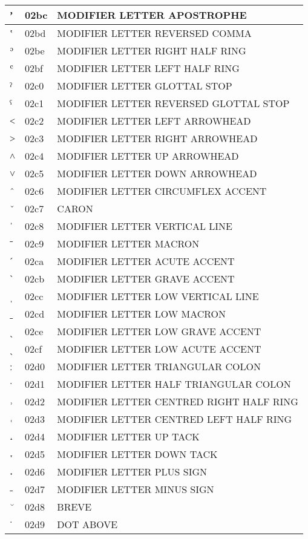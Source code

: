 \documentclass[12pt,letterpaper,openany]{book}
\begin{document}
\begin{center}
\begin{supertabular}{|m{0.25in}|m{0.5in}|m{4in}|}
ʼ & 02bc & MODIFIER LETTER APOSTROPHE\\\hline
ʽ & 02bd & MODIFIER LETTER REVERSED COMMA\\\hline
ʾ & 02be & MODIFIER LETTER RIGHT HALF RING\\\hline
ʿ & 02bf & MODIFIER LETTER LEFT HALF RING\\\hline
ˀ & 02c0 & MODIFIER LETTER GLOTTAL STOP\\\hline
ˁ & 02c1 & MODIFIER LETTER REVERSED GLOTTAL STOP\\\hline
˂ & 02c2 & MODIFIER LETTER LEFT ARROWHEAD\\\hline
˃ & 02c3 & MODIFIER LETTER RIGHT ARROWHEAD\\\hline
˄ & 02c4 & MODIFIER LETTER UP ARROWHEAD\\\hline
˅ & 02c5 & MODIFIER LETTER DOWN ARROWHEAD\\\hline
ˆ & 02c6 & MODIFIER LETTER CIRCUMFLEX ACCENT\\\hline
ˇ & 02c7 & CARON\\\hline
ˈ & 02c8 & MODIFIER LETTER VERTICAL LINE\\\hline
ˉ & 02c9 & MODIFIER LETTER MACRON\\\hline
ˊ & 02ca & MODIFIER LETTER ACUTE ACCENT\\\hline
ˋ & 02cb & MODIFIER LETTER GRAVE ACCENT\\\hline
ˌ & 02cc & MODIFIER LETTER LOW VERTICAL LINE\\\hline
ˍ & 02cd & MODIFIER LETTER LOW MACRON\\\hline
ˎ & 02ce & MODIFIER LETTER LOW GRAVE ACCENT\\\hline
ˏ & 02cf & MODIFIER LETTER LOW ACUTE ACCENT\\\hline
ː & 02d0 & MODIFIER LETTER TRIANGULAR COLON\\\hline
ˑ & 02d1 & MODIFIER LETTER HALF TRIANGULAR COLON\\\hline
˒ & 02d2 & MODIFIER LETTER CENTRED RIGHT HALF RING\\\hline
˓ & 02d3 & MODIFIER LETTER CENTRED LEFT HALF RING\\\hline
˔ & 02d4 & MODIFIER LETTER UP TACK\\\hline
˕ & 02d5 & MODIFIER LETTER DOWN TACK\\\hline
˖ & 02d6 & MODIFIER LETTER PLUS SIGN\\\hline
˗ & 02d7 & MODIFIER LETTER MINUS SIGN\\\hline
˘ & 02d8 & BREVE\\\hline
˙ & 02d9 & DOT ABOVE\\\hline

\end{supertabular}
\end{center}
\end{document}
